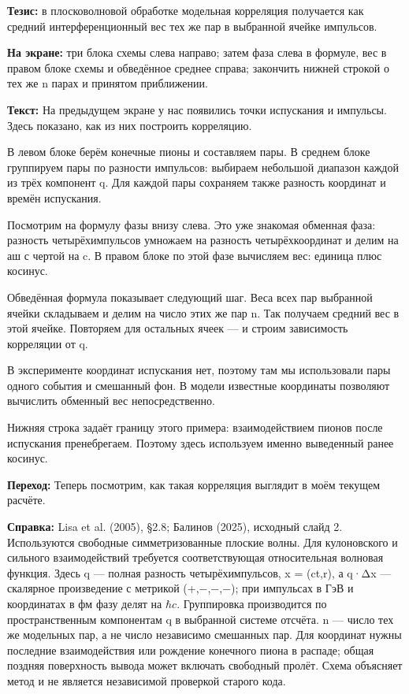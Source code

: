 \documentclass[11pt,a4paper]{article}
\newcommand{\hc}{\hbar c}
\begin{document}
\textbf{Тезис:} в плосковолновой обработке модельная корреляция получается как средний интерференционный вес тех же пар в выбранной ячейке импульсов.

\textbf{На экране:} три блока схемы слева направо; затем фаза слева в формуле, вес в правом блоке схемы и обведённое среднее справа; закончить нижней строкой о тех же n парах и принятом приближении.

\textbf{Текст:} На предыдущем экране у нас появились точки испускания и импульсы. Здесь показано, как из них построить корреляцию.

В левом блоке берём конечные пионы и составляем пары. В среднем блоке группируем пары по разности импульсов: выбираем небольшой диапазон каждой из трёх компонент q. Для каждой пары сохраняем также разность координат и времён испускания.

Посмотрим на формулу фазы внизу слева. Это уже знакомая обменная фаза: разность четырёхимпульсов умножаем на разность четырёхкоординат и делим на аш с чертой на c. В правом блоке по этой фазе вычисляем вес: единица плюс косинус.

Обведённая формула показывает следующий шаг. Веса всех пар выбранной ячейки складываем и делим на число этих же пар n. Так получаем средний вес в этой ячейке. Повторяем для остальных ячеек — и строим зависимость корреляции от q.

В эксперименте координат испускания нет, поэтому там мы использовали пары одного события и смешанный фон. В модели известные координаты позволяют вычислить обменный вес непосредственно.

Нижняя строка задаёт границу этого примера: взаимодействием пионов после испускания пренебрегаем. Поэтому здесь используем именно выведенный ранее косинус.

\textbf{Переход:} Теперь посмотрим, как такая корреляция выглядит в моём текущем расчёте.

\textbf{Справка:} Lisa et al. (2005), §2.8; Балинов (2025), исходный слайд 2. Используются свободные симметризованные плоские волны. Для кулоновского и сильного взаимодействий требуется соответствующая относительная волновая функция. Здесь q — полная разность четырёхимпульсов, x = (ct,r), а q·Δx — скалярное произведение с метрикой (+,−,−,−); при импульсах в ГэВ и координатах в фм фазу делят на \(\hc\). Группировка производится по пространственным компонентам q в выбранной системе отсчёта. n — число тех же модельных пар, а не число независимо смешанных пар. Для координат нужны последние взаимодействия или рождение конечного пиона в распаде; общая поздняя поверхность вывода может включать свободный пролёт. Схема объясняет метод и не является независимой проверкой старого кода.
\end{document}
